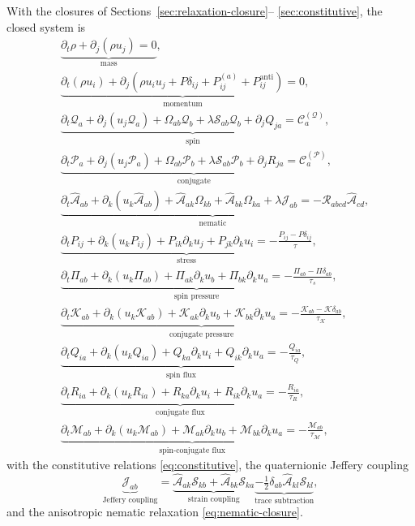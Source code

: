 \documentclass[11pt]{article}
\numberwithin{equation}{section}
\providecommand{\cQ}{\mathcal{Q}}
\providecommand{\cP}{\mathcal{P}}
\begin{document}
With the closures of Sections~\ref{sec:relaxation-closure}--
\ref{sec:constitutive}, the closed system is
\begin{align}
	&\underbrace{\partial_t \rho + \partial_j (\rho u_j) = 0}_{\text{mass}}, \\
	&\underbrace{\partial_t (\rho u_i) + \partial_j (\rho u_i u_j + P \delta_{ij}
		+ P_{ij}^{(a)} + P^{\mathrm{anti}}_{ij}) = 0}_{\text{momentum}}, \\
	&\underbrace{\partial_t \cQ_a + \partial_j (u_j \cQ_a) + \Omega_{ab} \cQ_b
		+ \lambda \mathcal{S}_{ab} \cQ_b + \partial_j Q_{ja}
		= \mathcal{C}^{(\cQ)}_a}_{\text{spin}}, \\
	&\underbrace{\partial_t \cP_a + \partial_j (u_j \cP_a) + \Omega_{ab} \cP_b
		+ \lambda \mathcal{S}_{ab} \cP_b + \partial_j R_{ja}
		= \mathcal{C}^{(\cP)}_a}_{\text{conjugate}}, \\
	&\underbrace{\partial_t \hat{\mathcal{A}}_{ab} + \partial_k (u_k
		\hat{\mathcal{A}}_{ab}) + \hat{\mathcal{A}}_{ak} \Omega_{kb}
		+ \hat{\mathcal{A}}_{bk} \Omega_{ka} + \lambda \mathcal{J}_{ab}
		= -\mathcal{R}_{abcd} \hat{\mathcal{A}}_{cd}}_{\text{nematic}}, \\
	&\underbrace{\partial_t P_{ij} + \partial_k (u_k P_{ij}) + P_{ik} \partial_k u_j
		+ P_{jk} \partial_k u_i = -\frac{P_{ij} - P \delta_{ij}}{\tau}}_{\text{stress}}, \\
	&\underbrace{\partial_t \Pi_{ab} + \partial_k (u_k \Pi_{ab})
		+ \Pi_{ak} \partial_k u_b + \Pi_{bk} \partial_k u_a
		= -\frac{\Pi_{ab} - \Pi \delta_{ab}}{\tau_s}}_{\text{spin pressure}}, \\
	&\underbrace{\partial_t \mathcal{K}_{ab} + \partial_k (u_k \mathcal{K}_{ab})
		+ \mathcal{K}_{ak} \partial_k u_b + \mathcal{K}_{bk} \partial_k u_a
		= -\frac{\mathcal{K}_{ab} - \mathcal{K} \delta_{ab}}{\tau_{\mathcal{K}}}}_{\text{conjugate pressure}}, \\
	&\underbrace{\partial_t Q_{ia} + \partial_k (u_k Q_{ia}) + Q_{ka} \partial_k u_i
		+ Q_{ik} \partial_k u_a = -\frac{Q_{ia}}{\tau_Q}}_{\text{spin flux}}, \\
	&\underbrace{\partial_t R_{ia} + \partial_k (u_k R_{ia}) + R_{ka} \partial_k u_i
		+ R_{ik} \partial_k u_a = -\frac{R_{ia}}{\tau_R}}_{\text{conjugate flux}}, \\
	&\underbrace{\partial_t \mathcal{M}_{ab} + \partial_k (u_k \mathcal{M}_{ab})
		+ \mathcal{M}_{ak} \partial_k u_b + \mathcal{M}_{bk} \partial_k u_a
		= -\frac{\mathcal{M}_{ab}}{\tau_{\mathcal{M}}}}_{\text{spin-conjugate flux}},
	\label{eq:closed-system}
\end{align}
with the constitutive relations \eqref{eq:constitutive}, the
quaternionic Jeffery coupling
\begin{equation}
	\underbrace{\mathcal{J}_{ab}}_{\text{Jeffery coupling}}
	= \underbrace{\hat{\mathcal{A}}_{ak} \mathcal{S}_{kb}
		+ \hat{\mathcal{A}}_{bk} \mathcal{S}_{ka}}_{\text{strain coupling}}
	\underbrace{- \tfrac{1}{2} \delta_{ab} \hat{\mathcal{A}}_{kl}
		\mathcal{S}_{kl}}_{\text{trace subtraction}},
	\label{eq:jeffery-coupling}
\end{equation}
and the anisotropic nematic relaxation \eqref{eq:nematic-closure}.
\end{document}
